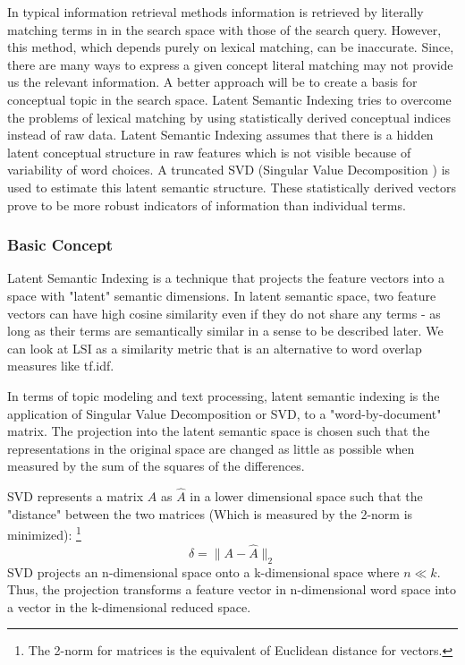In typical information retrieval methods information is retrieved by literally matching terms in in the search space with those of the 
search query. However, this method, which depends purely on lexical matching, can be inaccurate. Since, there are many ways to express a given concept literal matching may not provide us the relevant information. A better approach will be to create a basis for 
conceptual topic in the search space. Latent Semantic Indexing tries to overcome the problems of lexical matching by using 
statistically derived conceptual indices instead of raw data. Latent Semantic Indexing  assumes that there is a hidden latent conceptual 
structure in raw features which is not visible because of variability of word choices. A truncated SVD (Singular Value 
Decomposition ) is used to estimate this latent semantic structure. These statistically derived vectors prove to be more robust 
indicators of information than individual terms. 

\subsubsection*{Basic Concept}
Latent Semantic Indexing is a technique that projects the feature vectors into a space with "latent" semantic dimensions. In latent 
semantic space,  two feature vectors can have high cosine similarity even if they do not share any terms - as long as their terms are 
semantically similar in a sense to be described later. We can look at LSI as a similarity metric that is an alternative to word overlap 
measures like tf.idf. 

In terms of topic modeling and text processing, latent semantic indexing is the application of Singular Value Decomposition or SVD, 
to a "word-by-document" matrix. The projection into the latent semantic space is chosen such that the representations in the 
original space are changed as little as possible when measured by the sum of the squares of the differences. 

SVD represents a matrix $A$ as $\hat{A}$ in a lower dimensional space such that the "distance" between the two matrices (Which is 
measured by the 2-norm is minimized): 
\footnote{ The 2-norm for matrices is the equivalent of Euclidean distance for vectors.}
		$$ \delta = \| A - \hat{A} \| _{2}$$
SVD projects an n-dimensional space onto a k-dimensional space where $n \ll k$. Thus, the projection transforms a feature vector in  n-dimensional word space into a vector in the k-dimensional reduced 
space.

